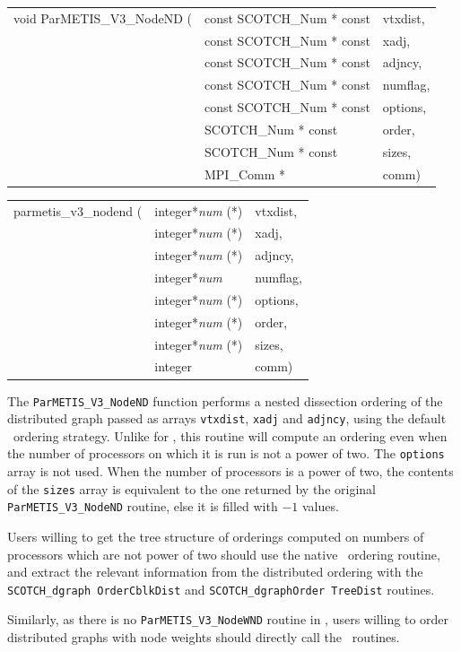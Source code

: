 \begin{itemize}
\progsyn

{\tt\begin{tabular}{l@{}ll}
void ParMETIS\_V3\_NodeND ( & const SCOTCH\_Num * const & vtxdist, \\
                            & const SCOTCH\_Num * const & xadj, \\
                            & const SCOTCH\_Num * const & adjncy, \\
                            & const SCOTCH\_Num * const & numflag, \\
                            & const SCOTCH\_Num * const & options, \\
                            & SCOTCH\_Num * const       & order, \\
                            & SCOTCH\_Num * const       & sizes, \\
                            & MPI\_Comm *               & comm)
\end{tabular}}

{\tt\begin{tabular}{l@{}ll}
parmetis\_v3\_nodend ( & integer*{\it num} (*) & vtxdist, \\
                       & integer*{\it num} (*) & xadj, \\
                       & integer*{\it num} (*) & adjncy, \\
                       & integer*{\it num}     & numflag, \\
                       & integer*{\it num} (*) & options, \\
                       & integer*{\it num} (*) & order, \\
                       & integer*{\it num} (*) & sizes, \\
                       & integer               & comm)
\end{tabular}}

\progdes

The {\tt ParMETIS\_V3\_NodeND} function performs a nested dissection
ordering of the distributed graph passed as arrays {\tt vtxdist},
{\tt xadj} and {\tt adjncy}, using the default \ptscotch\ ordering
strategy. Unlike for \parmetis, this routine will compute an ordering
even when the number of processors on which it is run is not a power
of two. The {\tt options} array is not used. When the number of
processors is a power of two, the contents of the {\tt sizes} array is
equivalent to the one returned by the original {\tt ParMETIS\_V3\_NodeND}
routine, else it is filled with $-1$ values.

Users willing to get the tree structure of orderings computed on
numbers of processors which are not power of two should use the native
\ptscotch\ ordering routine, and extract the relevant information from
the distributed ordering with the {\tt SCOTCH\_\lbt dgraph\lbt
Order\lbt Cblk\lbt Dist} and {\tt SCOTCH\_\lbt dgraph\lbt Order\lbt
Tree\lbt Dist} routines.

Similarly, as there is no {\tt ParMETIS\_V3\_NodeWND} routine in
\parmetis, users willing to order distributed graphs with node weights
should directly call the \ptscotch\ routines.
\end{itemize}

